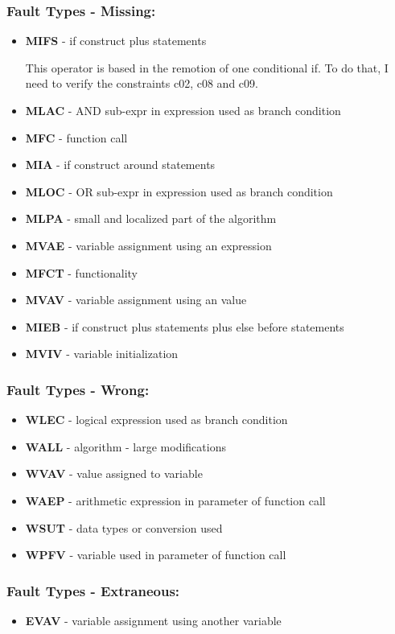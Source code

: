 \subsubsection{Fault Types - Missing:}
\begin{itemize}
	\item \textbf{MIFS} - if construct plus statements

	This operator is based in the remotion of one conditional if. To do that, I need to verify the constraints c02, c08 and c09.


	\item \textbf{MLAC} - AND sub-expr in expression used as branch condition
	\item \textbf{MFC}  - function call
	\item \textbf{MIA}  - if construct around statements
	\item \textbf{MLOC} - OR sub-expr in expression used as branch condition
	\item \textbf{MLPA} - small and localized part of the algorithm
	\item \textbf{MVAE} - variable assignment using an expression
	\item \textbf{MFCT} - functionality
	\item \textbf{MVAV} - variable assignment using an value
	\item \textbf{MIEB} - if construct plus statements plus else before statements
	\item \textbf{MVIV} - variable initialization
\end{itemize}

\subsubsection{Fault Types - Wrong:}
\begin{itemize}
	\item \textbf{WLEC} - logical expression used as branch condition
	\item \textbf{WALL} - algorithm - large modifications
	\item \textbf{WVAV} - value assigned to variable
	\item \textbf{WAEP} - arithmetic expression in parameter of function call
	\item \textbf{WSUT} - data types or conversion used
	\item \textbf{WPFV} - variable used in parameter of function call
\end{itemize}

\subsubsection{Fault Types - Extraneous:}
\begin{itemize}
	\item \textbf{EVAV} - variable assignment using another variable
\end{itemize}


